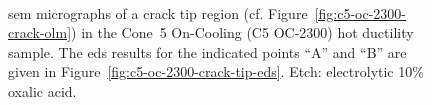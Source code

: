 {\begin{figure}
    \centering
     \\
    \caption{\Gls{sem} micrographs of a crack tip region (cf. Figure~\ref{fig:c5-oc-2300-crack-olm}) in the Cone~5 On-Cooling \protect{} (C5 OC-2300) hot ductility sample. The \gls{eds} results for the indicated points ``A'' and ``B'' are given in Figure~\ref{fig:c5-oc-2300-crack-tip-eds}. Etch: electrolytic 10\% oxalic acid.}
    \label{fig:c5-oc-2300-crack-tip-sem}
\end{figure}

}
